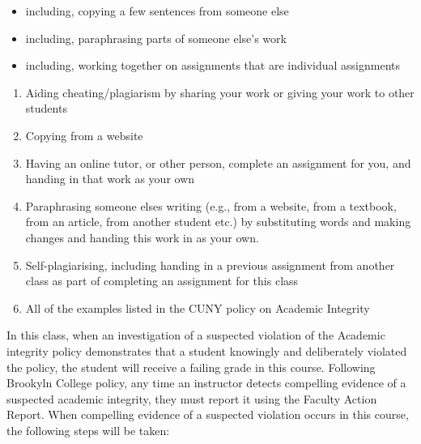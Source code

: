 \documentclass[]{book}
\providecommand{\tightlist}{%
  \setlength{\itemsep}{0pt}\setlength{\parskip}{0pt}}
\theoremstyle{definition}
\theoremstyle{definition}
\theoremstyle{definition}
\theoremstyle{remark}
\begin{document}
\begin{itemize}
\tightlist
\item
  including, copying a few sentences from someone else
\item
  including, paraphrasing parts of someone else's work
\item
  including, working together on assignments that are individual
  assignments
\end{itemize}

\begin{enumerate}
\def\labelenumi{\arabic{enumi}.}
\setcounter{enumi}{1}
\tightlist
\item
  Aiding cheating/plagiarism by sharing your work or giving your work to
  other students
\item
  Copying from a website
\item
  Having an online tutor, or other person, complete an assignment for
  you, and handing in that work as your own
\item
  Paraphrasing someone elses writing (e.g., from a website, from a
  textbook, from an article, from another student etc.) by substituting
  words and making changes and handing this work in as your own.
\item
  Self-plagiarising, including handing in a previous assignment from
  another class as part of completing an assignment for this class
\item
  All of the examples listed in the CUNY policy on Academic Integrity
\end{enumerate}

In this class, when an investigation of a suspected violation of the
Academic integrity policy demonstrates that a student knowingly and
deliberately violated the policy, the student will receive a failing
grade in this course. Following Brookyln College policy, any time an
instructor detects compelling evidence of a suspected academic
integrity, they must report it using the Faculty Action Report. When
compelling evidence of a suspected violation occurs in this course, the
following steps will be taken:
\end{document}
